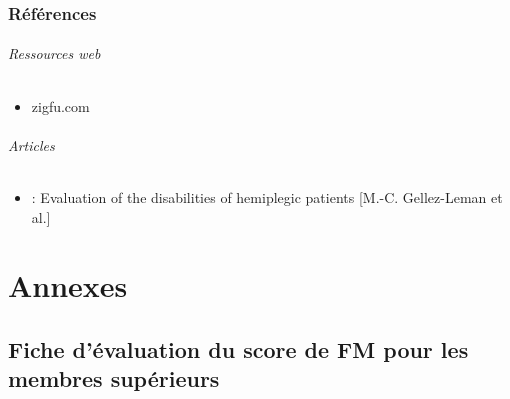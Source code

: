 \documentclass[french,12pt]{report}
\begin{document}
		\section{Références}
			\paragraph{Ressources web}
				\begin{itemize}
					\item zigfu.com
				\end{itemize}
			\paragraph{Articles}
				\begin {itemize}
					\item : Evaluation of the disabilities of hemiplegic patients [M.-C. Gellez-Leman et al.] \label{ref_analyse_litterature}
				\end{itemize}
				
\part{Annexes}
	\chapter{Fiche d'évaluation du score de FM pour les membres supérieurs} \label{evaluation_FM}
\end{document}

